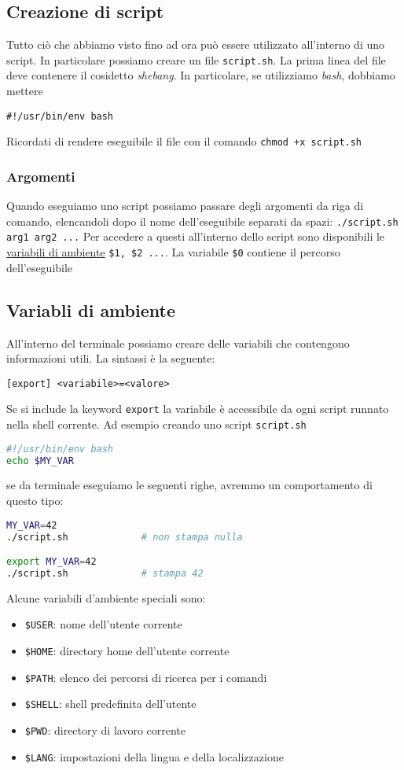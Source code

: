\subsection{Creazione di script}
Tutto ciò che abbiamo visto fino ad ora può essere utilizzato all'interno di uno script. In particolare possiamo creare un file \verb|script.sh|.
La prima linea del file deve contenere il cosidetto \textit{shebang}. In particolare, se utilizziamo \textit{bash}, dobbiamo mettere
\begin{center}
	\verb|#!/usr/bin/env bash|
\end{center}
Ricordati di rendere eseguibile il file con il comando \verb|chmod +x script.sh|
\subsubsection*{Argomenti}
Quando eseguiamo uno script possiamo passare degli argomenti da riga di comando, elencandoli dopo il nome dell'eseguibile separati da spazi: \verb|./script.sh arg1 arg2 ...|
\vskip3mm
Per accedere a questi all'interno dello script sono disponibili le \hyperref[variabili di ambiente]{variabili di ambiente} \verb|$1, $2 ...|. La variabile \verb|$0| contiene il percorso dell'eseguibile


\subsection{Variabli di ambiente}\label{variabili di ambiente}
All'interno del terminale possiamo creare delle variabili che contengono informazioni utili. La sintassi è la seguente:
\begin{center}
	\verb|[export] <variabile>=<valore>|
\end{center}
Se si include la keyword \verb|export| la variabile è accessibile da ogni script runnato nella shell corrente. Ad esempio creando uno script \verb|script.sh|
\begin{lstlisting}[language = bash, frame = none]
#!/usr/bin/env bash
echo $MY_VAR
\end{lstlisting}
se da terminale eseguiamo le seguenti righe, avremmo un comportamento di questo tipo:
\begin{lstlisting}[language = bash]
MY_VAR=42
./script.sh             # non stampa nulla

export MY_VAR=42
./script.sh             # stampa 42
\end{lstlisting}
Alcune variabili d'ambiente speciali sono:
\begin{itemize}
	\item \verb|$USER|: nome dell'utente corrente
	\item \verb|$HOME|: directory home dell'utente corrente
	\item \verb|$PATH|: elenco dei percorsi di ricerca per i comandi
	\item \verb|$SHELL|: shell predefinita dell'utente
	\item \verb|$PWD|: directory di lavoro corrente
	\item \verb|$LANG|: impostazioni della lingua e della localizzazione
\end{itemize}

